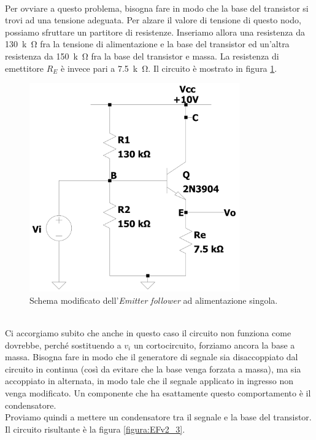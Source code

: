 \documentclass{report}
\begin{document}
\\\indent Per ovviare a questo problema, bisogna fare in modo che la base del transistor si trovi ad una tensione adeguata. Per alzare il valore di tensione di questo nodo, possiamo sfruttare un partitore di resistenze. Inseriamo allora una resistenza da \SI{130}{k\ohm} fra la tensione di alimentazione e la base del transistor ed un'altra resistenza da \SI{150}{k\ohm} fra la base del transistor e massa. La resistenza di emettitore $R_E$ è invece pari a \SI{7.5}{k\ohm}. Il circuito è mostrato in figura \ref{figura:EFv2_2}.
\begin{figure}[h]
\centering
\includegraphics[height=9cm]{immagini/EFv2_2}
\caption{Schema modificato dell'\textit{Emitter follower} ad alimentazione singola.}
\label{figura:EFv2_2}
\end{figure}
\\\indent Ci accorgiamo subito che anche in questo caso il circuito non funziona come dovrebbe, perché sostituendo a $v_i$ un cortocircuito, forziamo ancora la base a massa. Bisogna fare in modo che il generatore di segnale sia disaccoppiato dal circuito in continua (così da evitare che la base venga forzata a massa), ma sia accoppiato in alternata, in modo tale che il segnale applicato in ingresso non venga modificato. Un componente che ha esattamente questo comportamento è il condensatore. \\Proviamo quindi a mettere un condensatore tra il segnale e la base del transistor. Il circuito risultante è la figura \ref{figura:EFv2_3}.
\end{document}
